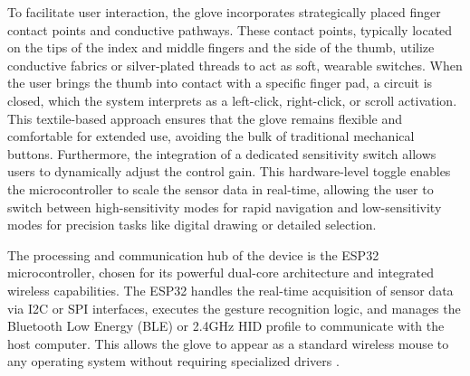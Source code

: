 To facilitate user interaction, the glove incorporates strategically placed finger contact points and conductive pathways. These contact points, typically located on the tips of the index and middle fingers and the side of the thumb, utilize conductive fabrics or silver-plated threads to act as soft, wearable switches. When the user brings the thumb into contact with a specific finger pad, a circuit is closed, which the system interprets as a left-click, right-click, or scroll activation. This textile-based approach ensures that the glove remains flexible and comfortable for extended use, avoiding the bulk of traditional mechanical buttons. Furthermore, the integration of a dedicated sensitivity switch allows users to dynamically adjust the control gain. This hardware-level toggle enables the microcontroller to scale the sensor data in real-time, allowing the user to switch between high-sensitivity modes for rapid navigation and low-sensitivity modes for precision tasks like digital drawing or detailed selection.

The processing and communication hub of the device is the ESP32 microcontroller, chosen for its powerful dual-core architecture and integrated wireless capabilities. The ESP32 handles the real-time acquisition of sensor data via I2C or SPI interfaces, executes the gesture recognition logic, and manages the Bluetooth Low Energy (BLE) or 2.4GHz HID profile to communicate with the host computer. This allows the glove to appear as a standard wireless mouse to any operating system without requiring specialized drivers \cite{prayogi2024esp32_airmouse}.

    

